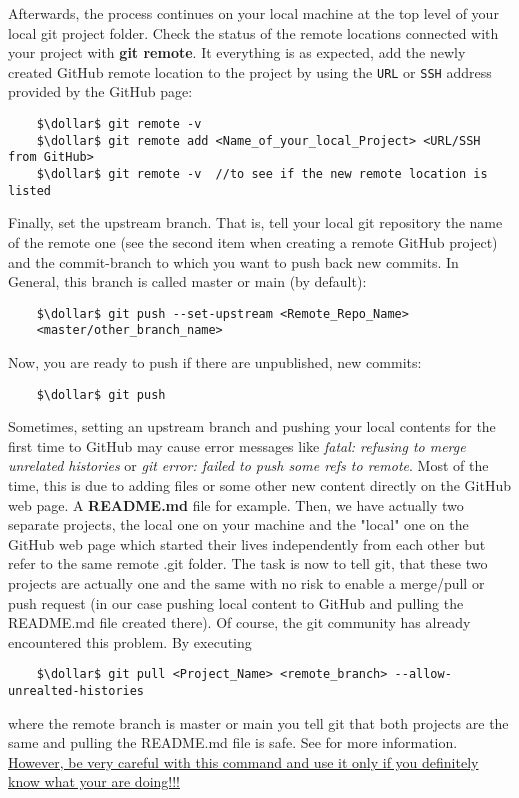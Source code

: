 Afterwards, the process continues on your local machine at the top level of your local git project folder. Check the status of the remote locations connected with 
your project with \textbf{git remote}. It everything is as expected, add the newly created GitHub remote location to the project by using the \verb|URL| or \verb|SSH|
address provided by the GitHub page:

\begin{lstlisting}
	$\dollar$ git remote -v
	$\dollar$ git remote add <Name_of_your_local_Project> <URL/SSH from GitHub>
	$\dollar$ git remote -v  //to see if the new remote location is listed
\end{lstlisting}

Finally, set the upstream branch. That is, tell your local git repository the name of the remote one (see the second item when creating a remote GitHub project) and the 
commit-branch to which you want to push back new commits. In General, this branch is called master or main (by default):

\begin{lstlisting}
	$\dollar$ git push --set-upstream <Remote_Repo_Name> 
	<master/other_branch_name>
\end{lstlisting}
Now, you are ready to push if there are unpublished, new commits:
\begin{lstlisting}
	$\dollar$ git push
\end{lstlisting}
Sometimes, setting an upstream branch and pushing your local contents for the first time to GitHub may cause error messages like \textit{fatal: refusing to merge
unrelated histories} or \textit{git error: failed to push some refs to remote}. Most of the time, this is due to adding files or some other new content directly 
on the GitHub web page. A \textbf{README.md} file for example. Then, we have actually two separate projects, the local one on your machine and the "local" one on the 
GitHub web page which started their lives independently from each other but refer to the same remote .git folder. The task is now to tell git, that these two projects
are actually one and the same with no risk to enable a merge/pull or push request (in our case pushing local content to GitHub and pulling the README.md file created there).  
Of course, the git community has already encountered this problem. By executing   
\begin{lstlisting}
	$\dollar$ git pull <Project_Name> <remote_branch> --allow-unrealted-histories
\end{lstlisting}
where the remote branch is master or main you tell git that both projects are the same and pulling the README.md file is safe. See \cite{Git2021git-merge} for more
information.
\\
\ul{However, be very careful with this command and use it only if you definitely know what your are doing!!!}







